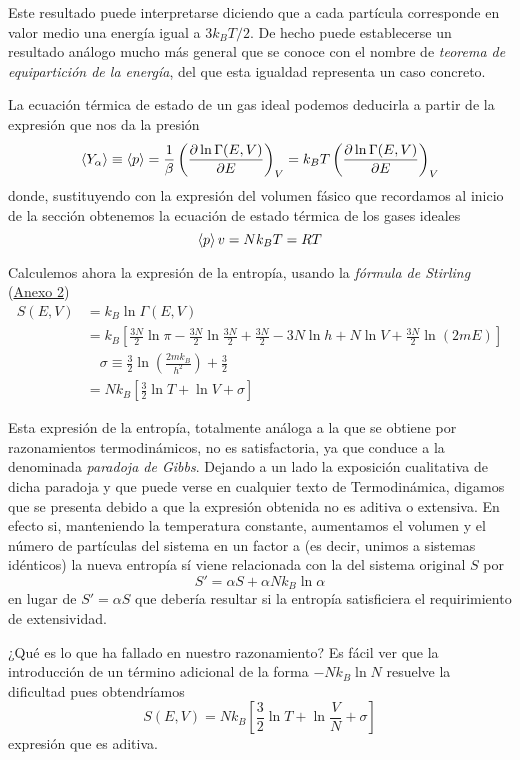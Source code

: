 Este resultado puede interpretarse diciendo que a cada partícula corresponde en valor medio una energía igual a $3k_BT /2$. De hecho puede establecerse un resultado análogo mucho más general que se conoce con el nombre de \textit{teorema de equipartición de la energía}, del que esta igualdad representa un caso concreto.

La ecuación térmica de estado de un gas ideal podemos deducirla a partir de la expresión que nos da la presión
$$\expval{Y_{\alpha}} \equiv \expval{p} = \frac{1}{\beta} \left( \pdv{\ln \Gamma(E, V)}{E} \right)_V = k_B T \left( \pdv{\ln \Gamma(E, V)}{E} \right)_V$$ donde, sustituyendo con la expresión del volumen fásico que recordamos al inicio de la sección obtenemos la ecuación de estado térmica de los gases ideales
$$\expval{p} v = N k_B T = RT$$

Calculemos ahora la expresión de la entropía, usando la \emph{fórmula de Stirling} (\hyperref[Anx2]{Anexo 2})
\begin{align}
	S(E,V) &= k_B \ln \Gamma(E, V)  \nonumber \\
	&= k_B \left[ \frac{3N}{2}\ln\pi -\frac{3N}{2}\ln \frac{3N}{2} + \frac{3N}{2} - 3N\ln h + N\ln V + \frac{3N}{2}\ln(2mE) \right]  \nonumber \\
	&\quad \boxed{\sigma \equiv \frac{3}{2} \ln \left( \frac{2mk_B}{h^2} \right) + \frac{3}{2}}  \nonumber \\
	&= N k_B \left[ \frac{3}{2}\ln T +\ln V + \sigma \right]
\end{align}

Esta expresión de la entropía, totalmente análoga a la que se obtiene por razonamientos termodinámicos, no es satisfactoria, ya que conduce a la denominada \emph{paradoja de Gibbs}. 
Dejando a un lado la exposición cualitativa de dicha paradoja y que puede verse en cualquier texto de Termodinámica, digamos que se presenta debido a que la expresión obtenida no es aditiva o extensiva.
En efecto si, manteniendo la temperatura constante, aumentamos el volumen y el número de partículas del sistema en un factor a (es decir, unimos a sistemas idénticos) la nueva entropía sí viene relacionada con la del sistema original $S$ por
$$S' = \alpha S + \alpha N k_B \ln \alpha$$
en lugar de $S' = \alpha S$ que debería resultar si la entropía satisficiera el requirimiento de extensividad.

¿Qué es lo que ha fallado en nuestro razonamiento? Es fácil ver que la introducción de un término adicional de la forma $-N k_B \ln N$ resuelve la dificultad pues obtendríamos
\begin{equation}
	S(E, V) =  N k_B \left[ \frac{3}{2}\ln T +\ln \frac{V}{N} + \sigma \right]
\end{equation}
expresión que es aditiva.

